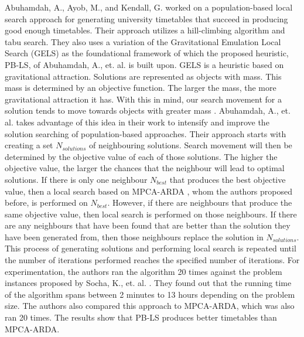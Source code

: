 Abuhamdah, A., Ayob, M., and Kendall, G. worked on a population-based local search approach for generating university timetables that succeed in producing good enough timetables. Their approach utilizes a hill-climbing algorithm and tabu search. They also uses a variation of the Gravitational Emulation Local Search (GELS) as the foundational framework of which the proposed heuristic, PB-LS, of Abuhamdah, A., et. al. is built upon. GELS is a heuristic based on gravitational attraction. Solutions are represented as objects with mass. This mass is determined by an objective function. The larger the mass, the more gravitational attraction it has. With this in mind, our search movement for a solution tends to move towards objects with greater mass \cite{webster-gels}. Abuhamdah, A., et. al. takes advantage of this idea in their work to intensify and improve the solution searching of population-based approaches. Their approach starts with creating a set $N_{solutions}$ of neighbouring solutions. Search movement will then be determined by the objective value of each of those solutions. The higher the objective value, the larger the chances that the neighbour will lead to optimal solutions. If there is only one neighbour $N_{best}$ that produces the best objective value, then a local search based on MPCA-ARDA \cite{abuhamdah-mpca-arda}, whom the authors proposed before, is performed on $N_{best}$. However, if there are neighbours that produce the same objective value, then local search is performed on those neighbours. If there are any neighbours that have been found that are better than the solution they have been generated from, then those neighbours replace the solution in $N_{solutions}$. This process of generating solutions and performing local search is repeated until the number of iterations performed reaches the specified number of iterations. For experimentation, the authors ran the algorithm 20 times against the problem instances proposed by Socha, K., et. al. \cite{socha-maxmin-ant-system}. They found out that the running time of the algorithm spans between 2 minutes to 13 hours depending on the problem size. The authors also compared this approach to MPCA-ARDA, which was also ran 20 times. The results show that PB-LS produces better timetables than MPCA-ARDA.


%
%
%
%
%
%
%
%
%